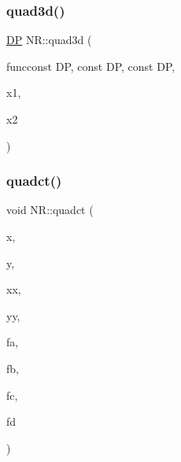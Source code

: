 \mbox{\label{namespaceNR_ad9f85b329d999d83a6cf387bcd5fd9a1}} 
\subsubsection{\texorpdfstring{quad3d()}{quad3d()}}
{\footnotesize\ttfamily \mbox{\hyperlink{namespaceNR_af6ff762dd605ff477b8e52387253a02a}{DP}} N\+R\+::quad3d (\begin{DoxyParamCaption}\item[{\mbox{\hyperlink{namespaceNR_af6ff762dd605ff477b8e52387253a02a}{DP}} }]{funcconst D\+P, const D\+P, const DP,  }\item[{const \mbox{\hyperlink{namespaceNR_af6ff762dd605ff477b8e52387253a02a}{DP}}}]{x1,  }\item[{const \mbox{\hyperlink{namespaceNR_af6ff762dd605ff477b8e52387253a02a}{DP}}}]{x2 }\end{DoxyParamCaption})}

\mbox{\label{namespaceNR_ae233b6071785340e925720885bb72ebd}} 
\subsubsection{\texorpdfstring{quadct()}{quadct()}}
{\footnotesize\ttfamily void N\+R\+::quadct (\begin{DoxyParamCaption}\item[{const \mbox{\hyperlink{namespaceNR_af6ff762dd605ff477b8e52387253a02a}{DP}}}]{x,  }\item[{const \mbox{\hyperlink{namespaceNR_af6ff762dd605ff477b8e52387253a02a}{DP}}}]{y,  }\item[{\mbox{\hyperlink{namespaceNR_a9f943da53862537c552e2a770cb170ae}{Vec\+\_\+\+I\+\_\+\+DP}} \&}]{xx,  }\item[{\mbox{\hyperlink{namespaceNR_a9f943da53862537c552e2a770cb170ae}{Vec\+\_\+\+I\+\_\+\+DP}} \&}]{yy,  }\item[{\mbox{\hyperlink{namespaceNR_af6ff762dd605ff477b8e52387253a02a}{DP}} \&}]{fa,  }\item[{\mbox{\hyperlink{namespaceNR_af6ff762dd605ff477b8e52387253a02a}{DP}} \&}]{fb,  }\item[{\mbox{\hyperlink{namespaceNR_af6ff762dd605ff477b8e52387253a02a}{DP}} \&}]{fc,  }\item[{\mbox{\hyperlink{namespaceNR_af6ff762dd605ff477b8e52387253a02a}{DP}} \&}]{fd }\end{DoxyParamCaption})}

